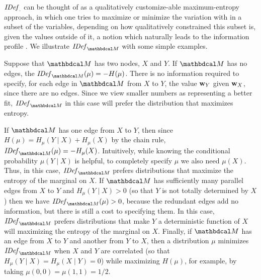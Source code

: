 \documentclass{article}
\begin{document}
$\mathit{IDef}_{.}$ can be thought of as a qualitatively customize-able maximum-entropy \cite{Jaynes57} approach, in which one tries to maximize or minimize the variation with in a subset of the variables, depending on how qualitatively constrained this subset is, given the values outside of it, a notion which naturally leads to the information profile . We illustrate $\IDef{\dg M}$ with some simple examples.  


\begin{example}
Suppose that $\dg M$ has two nodes, $X$ and $Y$. If $\dg M$ has no edges, the $\IDef{\dg M}(\mu) = - H(\mu)$.
There is no information required to specify, for each edge in ${\dg M}$ from $X$ to $Y$, the value ${\mathbf w}_Y$ given ${\mathbf w}_X$, since there are no edges. Since we view smaller numbers as representing a better fit, $\IDef{\dg M}$ in this case will prefer the distribution that maximizes entropy.

If $\dg M$ has one edge from $X$ to $Y$, then since $H(\mu) = H_{\mu}(Y \mid X) + H_\mu(X)$ by the chain rule, $\IDef{\dg M}(\mu) = -H_{\mu}(X)$. Intuitively, while knowing the conditional probability $\mu(Y \mid X)$ is helpful, to completely specify $\mu$ we also need $\mu(X)$. Thus, in this case, $\IDef{\dg M}$ prefers distributions that maximize the entropy of the marginal on $X$. If $\dg M$ has sufficiently many parallel edges
from $X$ to $Y$ and $H_{\mu}(Y \mid X) > 0$ (so that $Y$ is not totally determined by $X$) then we have $\IDef{\dg M}(\mu) > 0$, because the redundant edges add no information, but there is still a cost to specifying them. In this case, $\IDef{\dg M}$ prefers distributions that make $Y$ a deterministic function of $X$ will maximizing the entropy of the marginal on $X$. Finally, if ${\dg M}$ has an edge from $X$ to $Y$ and another from $Y$
to $X$, then a distribution $\mu$ minimizes $\IDef{\dg M}$ when 
$X$ and $Y$ are correlated (so that $H_\mu(Y \mid X) = H_\mu(X \mid Y) = 0$) while
maximizing $H(\mu)$, for example, by taking $\mu(0,0) = \mu(1,1) = 1/2$.
\end{example}
\end{document}
